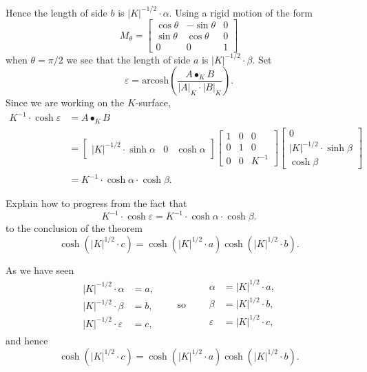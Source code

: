 \documentclass[handout,newpage,hints,,12pt,noauthor,nooutcomes]{ximera}
\begin{document}
Hence the length of side $b$ is $|K|^{-1/2}\cdot\alpha$. Using a rigid motion of the form
\[
M_\theta=
\begin{bmatrix}
  \cos\theta & -\sin\theta & 0\\
  \sin\theta & \cos\theta & 0\\
  0 & 0 & 1
\end{bmatrix}
\]
when $\theta = \pi/2$ we see that the length of side $a$ is $|K|^{-1/2}\cdot
\beta$. Set
\[
\varepsilon = \mathrm{arcosh}\left(\frac{A\bullet_K B}{|A|_K\cdot |B|_K}\right).
\]
Since we are working on the $K$-surface,
\begin{align*}
  K^{-1}\cdot \cosh \varepsilon &= A\bullet_K B\\
  &=
  \begin{bmatrix}
    |K|^{-1/2}\cdot \sinh\alpha &  0 & \cosh\alpha
  \end{bmatrix}
    \begin{bmatrix}
      1 & 0 & 0\\
      0 & 1 & 0\\
      0 & 0 & K^{-1}
    \end{bmatrix}
    \begin{bmatrix}
      0\\
      |K|^{-1/2}\cdot\sinh\beta\\
      \cosh\beta
    \end{bmatrix}\\
   &=K^{-1} \cdot \cosh\alpha \cdot \cosh\beta.
\end{align*}


\begin{problem}
  Explain how to progress from the fact that
  \[
  K^{-1}\cdot \cosh \varepsilon = K^{-1} \cdot \cosh\alpha \cdot \cosh\beta.
  \]
  to the conclusion of the theorem
  \[
  \cosh(|K|^{1/2}\cdot c)=\cosh(|K|^{1/2} \cdot a)\cosh(|K|^{1/2}\cdot b).
  \]
  \begin{freeResponse}
    As we have seen
    \[
    \begin{split}
      |K|^{-1/2}\cdot \alpha &= a,\\
      |K|^{-1/2}\cdot \beta  &= b,\\
      |K|^{-1/2}\cdot \varepsilon &= c,
    \end{split}
    \qquad\text{so}\qquad
    \begin{split}
      \alpha &= |K|^{1/2} \cdot a,\\
      \beta  &= |K|^{1/2} \cdot b,\\
      \varepsilon &= |K|^{1/2} \cdot c,\\
    \end{split}
    \]
    and hence
    \[
      \cosh\left(|K|^{1/2}\cdot c\right)=\cosh\left(|K|^{1/2} \cdot a\right)\cosh\left(|K|^{1/2}\cdot b\right).
    \]
  \end{freeResponse}
\end{problem}
\end{document}

